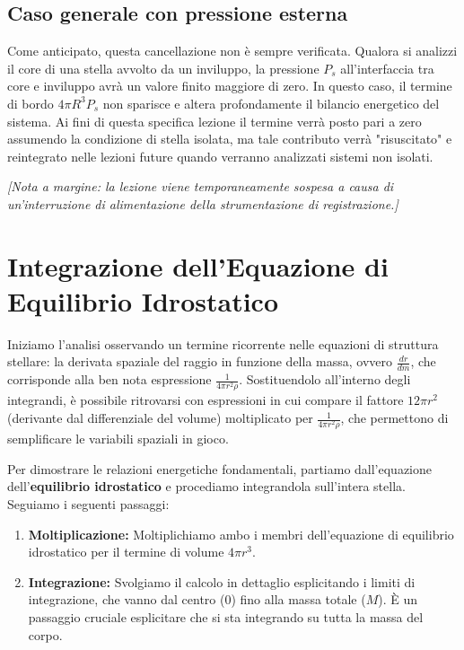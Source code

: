 \subsection{Caso generale con pressione esterna}
Come anticipato, questa cancellazione non è sempre verificata. Qualora si analizzi il core di una stella avvolto da un inviluppo, la pressione $P_s$ all'interfaccia tra core e inviluppo avrà un valore finito maggiore di zero.
In questo caso, il termine di bordo $4\pi R^3 P_s$ non sparisce e altera profondamente il bilancio energetico del sistema. Ai fini di questa specifica lezione il termine verrà posto pari a zero assumendo la condizione di stella isolata, ma tale contributo verrà "risuscitato" e reintegrato nelle lezioni future quando verranno analizzati sistemi non isolati.

\vspace{1em}
\textit{[Nota a margine: la lezione viene temporaneamente sospesa a causa di un'interruzione di alimentazione della strumentazione di registrazione.]}

\section{Integrazione dell'Equazione di Equilibrio Idrostatico}

Iniziamo l'analisi osservando un termine ricorrente nelle equazioni di struttura stellare: la derivata spaziale del raggio in funzione della massa, ovvero $\frac{dr}{dm}$, che corrisponde alla ben nota espressione $\frac{1}{4\pi r^2 \rho}$.
Sostituendolo all'interno degli integrandi, è possibile ritrovarsi con espressioni in cui compare il fattore $12\pi r^2$ (derivante dal differenziale del volume) moltiplicato per $\frac{1}{4\pi r^2 \rho}$, che permettono di semplificare le variabili spaziali in gioco.

Per dimostrare le relazioni energetiche fondamentali, partiamo dall'equazione dell'\textbf{equilibrio idrostatico} e procediamo integrandola sull'intera stella. Seguiamo i seguenti passaggi:
\begin{enumerate}
\item \textbf{Moltiplicazione:} Moltiplichiamo ambo i membri dell'equazione di equilibrio idrostatico per il termine di volume $4\pi r^3$.
\item \textbf{Integrazione:} Svolgiamo il calcolo in dettaglio esplicitando i limiti di integrazione, che vanno dal centro ($0$) fino alla massa totale ($M$). È un passaggio cruciale esplicitare che si sta integrando su tutta la massa del corpo.
\end{enumerate}

